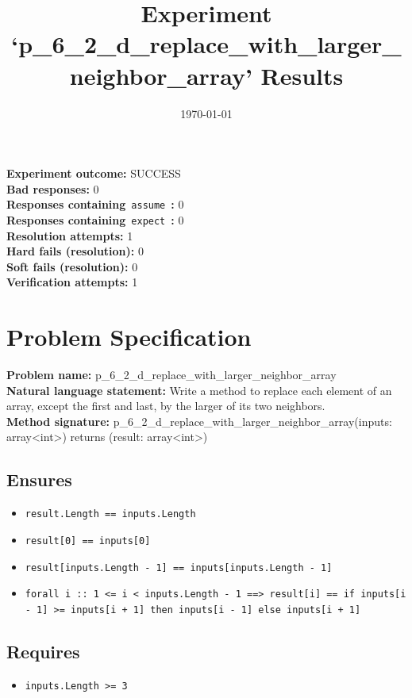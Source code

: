 \documentclass{article}
\begin{document}
\title{Experiment `p\_6\_2\_d\_replace\_with\_larger\_neighbor\_array' Results}
\author{\today}
\date{}
\maketitle
\textbf{Experiment outcome: }SUCCESS
\\\textbf{Bad responses: }0
\\\textbf{Responses containing}~\texttt{assume}~\textbf{: }0
\\\textbf{Responses containing}~\texttt{expect}~\textbf{: }0
\\\textbf{Resolution attempts: }1
\\\textbf{Hard fails (resolution): }0
\\\textbf{Soft fails (resolution): }0
\\\textbf{Verification attempts: }1
\section*{Problem Specification}
\textbf{Problem name: }p\_6\_2\_d\_replace\_with\_larger\_neighbor\_array
\\\textbf{Natural language statement: }Write a method to replace each element of an array, except the first and last, by the larger of its two neighbors.
\\\textbf{Method signature: }p\_6\_2\_d\_replace\_with\_larger\_neighbor\_array(inputs: array<int>) returns (result: array<int>)
\subsection*{Ensures}
\begin{itemize}
\item \texttt{result.Length == inputs.Length}
\item \texttt{result[0] == inputs[0]}
\item \texttt{result[inputs.Length - 1] == inputs[inputs.Length - 1]}
\item \texttt{forall i :: 1 <= i < inputs.Length - 1 ==> result[i] == if inputs[i - 1] >= inputs[i + 1] then inputs[i - 1] else inputs[i + 1]}
\end{itemize}
\subsection*{Requires}
\begin{itemize}
\item \texttt{inputs.Length >= 3}
\end{itemize}
\clearpage
\end{document}
